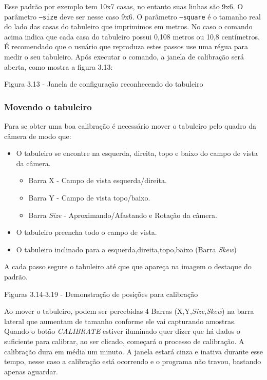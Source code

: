 Esse padrão por exemplo tem 10x7 casas, no entanto suas linhas são 9x6. O parâmetro \texttt{--size} deve ser nesse caso 9x6.
O parâmetro \texttt{--square} é o tamanho real do lado das casas do tabuleiro que imprimimos em metros. No caso o comando acima indica que cada casa do tabuleiro possui 0,108 metros ou 10,8 centímetros. É recomendado que o usuário que reproduza estes passos use uma régua para medir o seu tabuleiro.
Após executar o comando, a janela de calibração será aberta, como mostra a figura 3.13:

Figura 3.13 - Janela de configuração reconhecendo do tabuleiro

\subsubsection{Movendo o tabuleiro}

Para se obter uma boa calibração é necessário mover o tabuleiro pelo quadro da câmera de modo que:

\begin{itemize}
	\item{O tabuleiro se encontre na esquerda, direita, topo e baixo do campo de vista da câmera.}
	\begin{itemize}
		\item{Barra X - Campo de vista esquerda/direita.}
		\item{Barra Y - Campo de vista topo/baixo.}
		\item{Barra \textit{Size} - Aproximando/Afastando e Rotação da câmera.}
	\end{itemize}
	\item{O tabuleiro preencha todo o campo de vista.}
	\item{O tabuleiro inclinado para a esquerda,direita,topo,baixo (Barra \textit{Skew})}
\end{itemize}

A cada passo segure o tabuleiro até que que apareça na imagem o destaque do padrão.

Figuras 3.14-3.19 - Demonstração de posições para calibração

Ao mover o tabuleiro, podem ser percebidas 4 Barras (X,Y,\textit{Size},\textit{Skew}) na barra lateral que aumentam de tamanho conforme ele vai capturando amostras. Quando o botão \textit{CALIBRATE} estiver iluminado quer dizer que há dados o suficiente para calibrar, ao ser clicado, começará o processo de calibração.
A calibração dura em média um minuto. A janela estará cinza e inativa durante esse tempo, nesse caso a calibração está ocorrendo e o programa não travou, bastando apenas aguardar.

